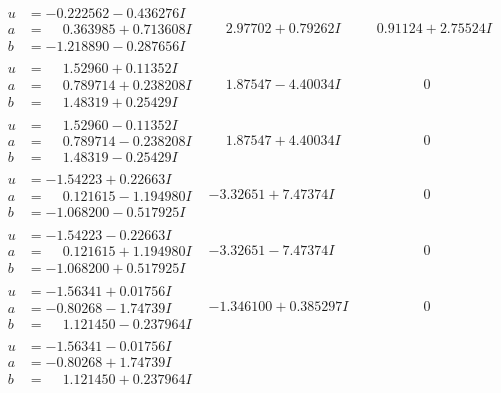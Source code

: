 \documentclass[1p]{elsarticle_modified}
\theoremstyle{definition}
\begin{document}
$$\begin{array}{c|c|c}
\begin{aligned}
u &= -0.222562 - 0.436276 I \\
a &= \phantom{-}0.363985 + 0.713608 I \\
b &= -1.218890 - 0.287656 I\end{aligned}
 & \phantom{-}2.97702 + 0.79262 I & \phantom{-}0.91124 + 2.75524 I \\ \hline\begin{aligned}
u &= \phantom{-}1.52960 + 0.11352 I \\
a &= \phantom{-}0.789714 + 0.238208 I \\
b &= \phantom{-}1.48319 + 0.25429 I\end{aligned}
 & \phantom{-}1.87547 - 4.40034 I & \phantom{-0.000000 } 0 \\ \hline\begin{aligned}
u &= \phantom{-}1.52960 - 0.11352 I \\
a &= \phantom{-}0.789714 - 0.238208 I \\
b &= \phantom{-}1.48319 - 0.25429 I\end{aligned}
 & \phantom{-}1.87547 + 4.40034 I & \phantom{-0.000000 } 0 \\ \hline\begin{aligned}
u &= -1.54223 + 0.22663 I \\
a &= \phantom{-}0.121615 - 1.194980 I \\
b &= -1.068200 - 0.517925 I\end{aligned}
 & -3.32651 + 7.47374 I & \phantom{-0.000000 } 0 \\ \hline\begin{aligned}
u &= -1.54223 - 0.22663 I \\
a &= \phantom{-}0.121615 + 1.194980 I \\
b &= -1.068200 + 0.517925 I\end{aligned}
 & -3.32651 - 7.47374 I & \phantom{-0.000000 } 0 \\ \hline\begin{aligned}
u &= -1.56341 + 0.01756 I \\
a &= -0.80268 - 1.74739 I \\
b &= \phantom{-}1.121450 - 0.237964 I\end{aligned}
 & -1.346100 + 0.385297 I & \phantom{-0.000000 } 0 \\ \hline\begin{aligned}
u &= -1.56341 - 0.01756 I \\
a &= -0.80268 + 1.74739 I \\
b &= \phantom{-}1.121450 + 0.237964 I\end{aligned}

\end{array}$$
\end{document}
